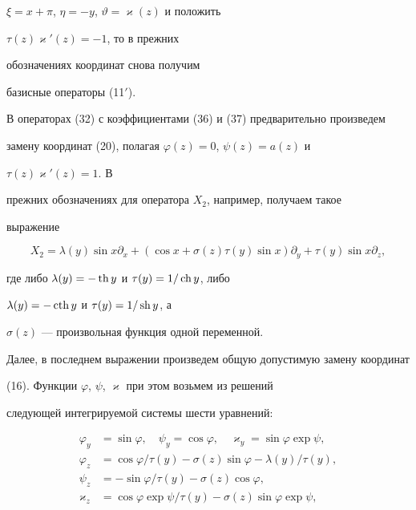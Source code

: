 $\xi=x+\pi$, $\eta=-y$, $\vartheta=\varkappa(z)$ и положить 


$\tau(z)\varkappa'(z)=-1$, то в прежних 


обозначениях координат снова получим 


базисные операторы (11${}'$). 


 


В операторах (32) с коэффициентами (36) и (37) предварительно произведем 


замену координат (20), полагая $\varphi(z)=0$, $\psi(z)=a(z)$ и 


$\tau(z)\varkappa'(z)=1$. В 


прежних обозначениях для оператора $X_2$, например, получаем такое 


выражение


$$ 


X_2=\lambda(y)\sin x\partial_x+ 


(\cos x+\sigma(z)\tau(y)\sin x)\partial_y+ 


\tau(y)\sin x\partial_z, 


$$ 


где либо $\lambda(y)=-\operatorname{th} y$ и $\tau(y)=1/\operatorname{ch} y$, либо 


$\lambda(y)=-\operatorname{cth} y$ и $\tau(y)=1/\operatorname{sh} y$, а 


$\sigma(z)$ --- произвольная функция одной переменной. 


 


Далее, в последнем выражении произведем общую допустимую замену координат 


(16). Функции $\varphi$, $\psi$, $\varkappa$ при этом возьмем из решений 


следующей интегрируемой системы шести уравнений: 


\begin{align*} 


\varphi_y&=\sin\varphi,\quad \psi_y=\cos\varphi,\quad 


\varkappa_y=\sin\varphi\exp\psi,\\ 


\varphi_z&=\cos\varphi/\tau(y)-\sigma(z)\sin\varphi 


-\lambda(y)/\tau(y),\\ 


\psi_z&=-\sin\varphi/\tau(y)-\sigma(z)\cos\varphi,\\ 


\varkappa_z&=\cos\varphi\exp\psi/\tau(y)- 


\sigma(z)\sin\varphi\exp\psi, 


\end{align*} 


